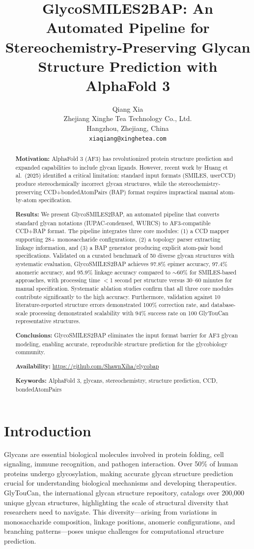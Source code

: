 \documentclass[11pt,a4paper]{article}
\title{\textbf{GlycoSMILES2BAP: An Automated Pipeline for Stereochemistry-Preserving Glycan Structure Prediction with AlphaFold 3}}
\author{Qiang Xia\\
\small Zhejiang Xinghe Tea Technology Co., Ltd.\\
\small Hangzhou, Zhejiang, China\\
\small \texttt{xiaqiang@xinghetea.com}}
\date{}
\begin{document}
\maketitle
\begin{abstract}
\noindent\textbf{Motivation:} AlphaFold 3 (AF3) has revolutionized protein structure prediction and expanded capabilities to include glycan ligands. However, recent work by Huang et al.\ (2025) identified a critical limitation: standard input formats (SMILES, userCCD) produce stereochemically incorrect glycan structures, while the stereochemistry-preserving CCD+bondedAtomPairs (BAP) format requires impractical manual atom-by-atom specification.

\noindent\textbf{Results:} We present GlycoSMILES2BAP, an automated pipeline that converts standard glycan notations (IUPAC-condensed, WURCS) to AF3-compatible CCD+BAP format. The pipeline integrates three core modules: (1) a CCD mapper supporting 28+ monosaccharide configurations, (2) a topology parser extracting linkage information, and (3) a BAP generator producing explicit atom-pair bond specifications. Validated on a curated benchmark of 50 diverse glycan structures with systematic evaluation, GlycoSMILES2BAP achieves 97.8\% epimer accuracy, 97.4\% anomeric accuracy, and 95.9\% linkage accuracy compared to ${\sim}60$\% for SMILES-based approaches, with processing time $<$1 second per structure versus 30--60 minutes for manual specification. Systematic ablation studies confirm that all three core modules contribute significantly to the high accuracy. Furthermore, validation against 10 literature-reported structure errors demonstrated 100\% correction rate, and database-scale processing demonstrated scalability with 94\% success rate on 100 GlyTouCan representative structures.

\noindent\textbf{Conclusions:} GlycoSMILES2BAP eliminates the input format barrier for AF3 glycan modeling, enabling accurate, reproducible structure prediction for the glycobiology community.

\noindent\textbf{Availability:} \url{https://github.com/ShawnXiha/glycobap}

\noindent\textbf{Keywords:} AlphaFold 3, glycans, stereochemistry, structure prediction, CCD, bondedAtomPairs
\end{abstract}

\section{Introduction}
Glycans are essential biological molecules involved in protein folding, cell signaling, immune recognition, and pathogen interaction. Over 50\% of human proteins undergo glycosylation, making accurate glycan structure prediction crucial for understanding biological mechanisms and developing therapeutics. GlyTouCan, the international glycan structure repository, catalogs over 200,000 unique glycan structures, highlighting the scale of structural diversity that researchers need to navigate. This diversity---arising from variations in monosaccharide composition, linkage positions, anomeric configurations, and branching patterns---poses unique challenges for computational structure prediction.
\end{document}

